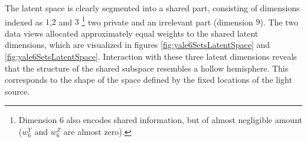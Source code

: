 The latent space is clearly segmented into a shared part, consisting
of dimensions indexed as $1$,$2$ and $3$ \footnote{Dimension 6
also encodes shared information, but of almost negligible amount ($w^Y_6$ and $w^Z_6$ are almost zero).}
two private and an irrelevant part (dimension $9$).
The two data views allocated approximately equal
weights to the shared latent dimensions, which %
are visualized in figures
\ref{fig:yale6SetsLatentSpace} and
\ref{fig:yale6SetsLatentSpace}. Interaction
with these three latent dimensions reveals that the structure of the
shared subspace resembles a hollow hemisphere. This corresponds to the
shape of the space defined by the fixed locations of the light source.
%

